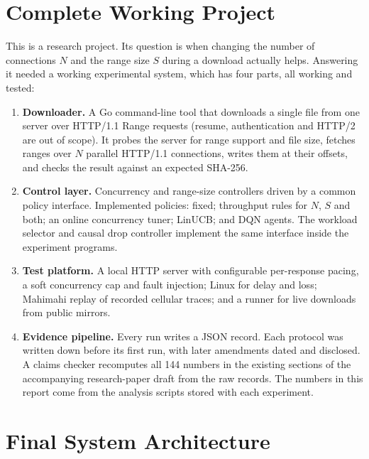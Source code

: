 \chapter{Complete Working Project}
This is a research project. Its question is when changing the number of connections $N$ and the range size $S$ during a download actually helps. Answering it needed a working experimental system, which has four parts, all working and tested:
\begin{enumerate}
\item \textbf{Downloader.} A Go command-line tool that downloads a single file from one server over HTTP/1.1 Range requests (resume, authentication and HTTP/2 are out of scope). It probes the server for range support and file size, fetches ranges over $N$ parallel HTTP/1.1 connections, writes them at their offsets, and checks the result against an expected SHA-256.
\item \textbf{Control layer.} Concurrency and range-size controllers driven by a common policy interface. Implemented policies: fixed; throughput rules for $N$, $S$ and both; an online concurrency tuner; LinUCB; and DQN agents. The workload selector and causal drop controller implement the same interface inside the experiment programs.
\item \textbf{Test platform.} A local HTTP server with configurable per-response pacing, a soft concurrency cap and fault injection; Linux  for delay and loss; Mahimahi replay of recorded cellular traces; and a runner for live downloads from public mirrors.
\item \textbf{Evidence pipeline.} Every run writes a JSON record. Each protocol was written down before its first run, with later amendments dated and disclosed. A claims checker recomputes all 144 numbers in the existing sections of the accompanying research-paper draft from the raw records. The numbers in this report come from the analysis scripts stored with each experiment.
\end{enumerate}


\chapter{Final System Architecture}

